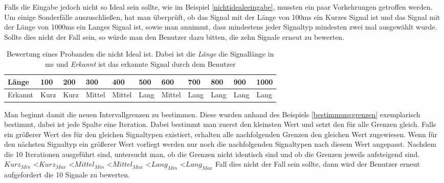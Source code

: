 Falls die Eingabe jedoch nicht so Ideal sein sollte, wie im Beispiel \autoref{nichtidealeeingabe}, mussten ein paar Vorkehrungen getroffen werden. Um einige Sonderf{\"a}lle auszuschlie{\ss}en, hat man {\"u}berpr{\"u}ft, ob das Signal mit der L{\"a}nge von 100ms ein Kurzes Signal ist und das Signal mit der L{\"a}nge von 1000ms ein Langes Signal ist, sowie man annimmt, dass mindestens jeder Signaltyp mindesten zwei mal ausgew{\"a}hlt wurde. Sollte dies nicht der Fall sein, so w{\"u}rde man den Benutzer dazu bitten, die zehn Signale erneut zu bewerten. 

\begin{table}[]
\centering
\caption{Bewertung eines Probanden die nicht Ideal ist. Dabei ist die \textit{L{\"a}nge} die Signall{\"a}nge in ms und \textit{Erkannt} ist das erkannte Signal durch dem Benutzer}
\label{nichtidealeeingabe}
\begin{tabular}{|l|l|l|l|l|l|l|l|l|l|l|}
\hline
 L{\"a}nge & 100 & 200 & 300 & 400 & 500 & 600 & 700 & 800 & 900 & 1000 \\ \hline
 Erkannt & Kurz & Kurz & Mittel & Mittel & Lang & Mittel & Lang & Lang & Lang & Lang \\ \hline
\end{tabular}
\end{table}

Man beginnt damit die neuen Intervallgrenzen zu bestimmen. Diese wurden anhand des Beispiels \autoref{bestimmunggrenzen} exemplarisch bestimmt, dabei ist jede Spalte eine Iteration. Dabei bestimmt man zuerst den kleinsten Wert und setzt den f{\"u}r alle Grenzen gleich. Falls ein gr{\"o}{\ss}erer Wert des f{\"u}r den gleichen Signaltypen existiert, erhalten alle nachfolgenden Grenzen den gleichen Wert zugewiesen. Wenn f{\"u}r den n{\"a}chsten Signaltyp ein gr{\"o}{\ss}erer Wert vorliegt werden nur noch die nachfolgenden Signaltypen nach diesem Wert angepasst. Nachdem die 10 Iterationen ausgef{\"u}hrt sind, untersucht man, ob die Grenzen nicht identisch sind und ob die Grenzen jeweils aufsteigend sind. 
\\$Kurz_{Min}$ \textless $Kurz_{Max}$ \textless $Mittel_{Min}$ \textless $Mittel_{Max}$ \textless $Lang_{Min}$ \textless $Lang_{Max}$
Fall dies nicht der Fall sein sollte, dann wird der Benutzer erneut aufgefordert die 10 Signale zu bewerten.

